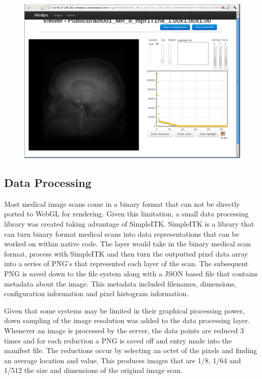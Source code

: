 \documentclass[annual]{acmsiggraph}
\begin{document}
\begin{figure}[htb]
\includegraphics[scale=0.475]{clean_interface.png}
\label{Medipa System Architecture}
\end{figure}

\subsection{Data Processing}

Most medical image scans come in a binary format that can not be directly ported to WebGL for rendering.  Given this limitation, a small data processing library was created taking advantage of SimpleITK.  SimpleITK is a library that can turn binary format medical scans into data representations that can be worked on within native code.  The layer would take in the binary medical scan format, process with SimpleITK and then turn the outputted pixel data array into a series of PNG's that represented each layer of the scan.  The subsequent PNG is saved down to the file system along with a JSON based file that contains metadata about the image.  This metadata included filenames, dimensions, configuration information and pixel histogram information.

Given that some systems may be limited in their graphical processing power, down sampling of the image resolution was added to the data processing layer.  Whenever an image is processed by the server, the data points are reduced 3 times and for each reduction a PNG is saved off and entry made into the manifest file.  The reductions occur by selecting an octet of the pixels and finding an average location and value.  This produces images that are 1/8, 1/64 and 1/512 the size and dimensions of the original image scan.
\end{document}
